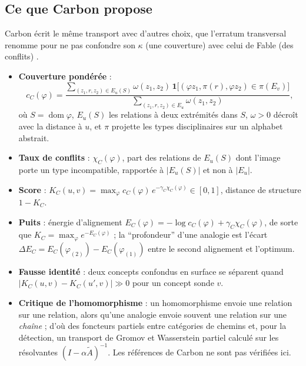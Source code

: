 \documentclass[11pt,a4paper]{article}
\theoremstyle{definition}
\theoremstyle{plain}
\newcommand{\dom}{\operatorname{dom}}
\begin{document}
\subsection{Ce que Carbon propose}

Carbon écrit le même transport avec d'autres choix, que l'erratum transversal renomme pour ne pas
confondre son $\kappa$ (une couverture) avec celui de Fable (des conflits) \cite{erratumkappa}.
\begin{itemize}
\item \textbf{Couverture pondérée} \cite[section~2.2, l.~36-38]{carbon} :
\[ c_C(\varphi)=\frac{\sum_{(z_1,r,z_2)\in E_u(S)}\omega(z_1,z_2)\,\mathbf{1}\bigl[(\varphi z_1,\pi(r),\varphi z_2)\in\pi(E_v)\bigr]}{\sum_{(z_1,r,z_2)\in E_u}\omega(z_1,z_2)}, \]
où $S=\dom\varphi$, $E_u(S)$ les relations à deux
extrémités dans $S$, $\omega>0$ décroît avec la distance à $u$, et $\pi$ projette les types
disciplinaires sur un alphabet abstrait.
\item \textbf{Taux de conflits} : $\chi_C(\varphi)$, part des relations de $E_u(S)$ dont l'image porte
un type incompatible, rapportée à $|E_u(S)|$ et non à $|E_u|$.
\item \textbf{Score} \cite[l.~39-40]{carbon} : $K_C(u,v)=\max_\varphi c_C(\varphi)\,e^{-\gamma_C\chi_C(\varphi)}\in[0,1]$,
distance de structure $1-K_C$.
\item \textbf{Puits} \cite[l.~62]{carbon} : énergie d'alignement $E_C(\varphi)=-\log c_C(\varphi)+\gamma_C\chi_C(\varphi)$,
de sorte que $K_C=\max_\varphi e^{-E_C(\varphi)}$ ; la \enquote{profondeur} d'une analogie est
l'écart $\Delta E_C=E_C(\varphi_{(2)})-E_C(\varphi_{(1)})$ entre le second alignement et l'optimum.
\item \textbf{Fausse identité} : deux concepts confondus en surface se séparent quand
$|K_C(u,v)-K_C(u',v)|\gg0$ pour un concept sonde $v$.
\item \textbf{Critique de l'homomorphisme} \cite[verdict et section~1]{carbonhomo} : un homomorphisme
envoie une relation sur une relation, alors qu'une analogie envoie souvent une relation sur une
\emph{chaîne} ; d'où des foncteurs partiels entre catégories de chemins et, pour la détection, un
transport de Gromov et Wasserstein partiel calculé sur les résolvantes $(I-\alpha\tilde A)^{-1}$.
Les références de Carbon ne sont pas vérifiées ici.
\end{itemize}
\end{document}
